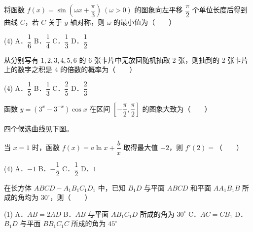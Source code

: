 \begin{question}
将函数 $f(x)=\sin\left(\omega x+\dfrac{\pi}{3}\right)\ (\omega>0)$ 的图象向左平移 $\dfrac{\pi}{2}$ 个单位长度后得到曲线 $C$，若 $C$ 关于 $y$ 轴对称，则 $\omega$ 的最小值为\mbox{（　　）}

\begin{gkopts}(4)
\task A．$\dfrac16$
\task B．$\dfrac14$
\task C．$\dfrac13$
\task D．$\dfrac12$
\end{gkopts}

\end{question}
\begin{question}
从分别写有 $1,2,3,4,5,6$ 的 6 张卡片中无放回随机抽取 2 张，则抽到的 2 张卡片上的数字之积是 4 的倍数的概率为\mbox{（　　）}

\begin{gkopts}(4)
\task A．$\dfrac15$
\task B．$\dfrac13$
\task C．$\dfrac25$
\task D．$\dfrac23$
\end{gkopts}

\Needspace{0.4\textheight}
\end{question}
\begin{question}
函数 $y=(3^x-3^{-x})\cos x$ 在区间 $\left[-\dfrac{\pi}{2},\dfrac{\pi}{2}\right]$ 的图象大致为\mbox{（　　）}

四个候选曲线见下图。
\nopagebreak[4]
\begin{center}\end{center}
\nopagebreak[4]
\end{question}
\begin{question}
当 $x=1$ 时，函数 $f(x)=a\ln x+\dfrac bx$ 取得最大值 $-2$，则 $f'(2)=$\mbox{（　　）}

\begin{gkopts}(4)
\task A．$-1$
\task B．$-\dfrac12$
\task C．$\dfrac12$
\task D．$1$
\end{gkopts}

\end{question}
\begin{question}
在长方体 $ABCD-A_1B_1C_1D_1$ 中，已知 $B_1D$ 与平面 $ABCD$ 和平面 $AA_1B_1B$ 所成的角均为 $30^\circ$，则\mbox{（　　）}

\begin{gkopts}(1)
\task A．$AB=2AD$
\task B．$AB$ 与平面 $AB_1C_1D$ 所成的角为 $30^\circ$
\task C．$AC=CB_1$
\task D．$B_1D$ 与平面 $BB_1C_1C$ 所成的角为 $45^\circ$
\end{gkopts}

\end{question}
